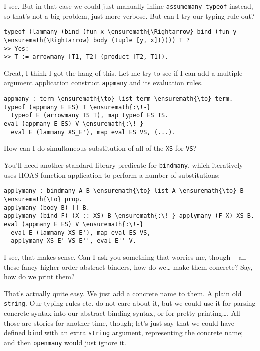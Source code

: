 \heroSTUDENT{} I see. But in that case we could just manually inline
\texttt{assumemany\ typeof} instead, so that's not a big problem, just
more verbose. But can I try our typing rule out?

\begin{verbatim}
typeof (lammany (bind (fun x \ensuremath{\Rightarrow} bind (fun y \ensuremath{\Rightarrow} body (tuple [y, x]))))) T ?
>> Yes:
>> T := arrowmany [T1, T2] (product [T2, T1]).
\end{verbatim}

\noindent
Great, I think I got the hang of this. Let me try to see if I can add a
multiple-argument application construct \texttt{appmany} and its
evaluation rules.

\begin{verbatim}
appmany : term \ensuremath{\to} list term \ensuremath{\to} term.
typeof (appmany E ES) T \ensuremath{:\!-}
  typeof E (arrowmany TS T), map typeof ES TS.
eval (appmany E ES) V \ensuremath{:\!-}
  eval E (lammany XS_E'), map eval ES VS, (...).
\end{verbatim}

\noindent
How can I do simultaneous substitution of all of the \texttt{XS} for
\texttt{VS}?

\heroADVISOR{} You'll need another standard-library predicate for
\texttt{bindmany}, which iteratively uses HOAS function application to
perform a number of substitutions:

\begin{verbatim}
applymany : bindmany A B \ensuremath{\to} list A \ensuremath{\to} B \ensuremath{\to} prop.
applymany (body B) [] B.
applymany (bind F) (X :: XS) B \ensuremath{:\!-} applymany (F X) XS B.
eval (appmany E ES) V \ensuremath{:\!-}
  eval E (lammany XS_E'), map eval ES VS,
  applymany XS_E' VS E'', eval E'' V.
\end{verbatim}

\heroSTUDENT{} I see, that makes sense. Can I ask you something that worries
me, though -- all these fancy higher-order abstract binders, how do
we\ldots{} make them concrete? Say, how do we print them?

\heroADVISOR{} That's actually quite easy. We just add a concrete name to
them. A plain old \texttt{string}. Our typing rules etc. do not care
about it, but we could use it for parsing concrete syntax into our
abstract binding syntax, or for pretty-printing\ldots{}. All those are
stories for another time, though; let's just say that we could have
defined \texttt{bind} with an extra \texttt{string} argument,
representing the concrete name; and then \texttt{openmany} would just
ignore it.

